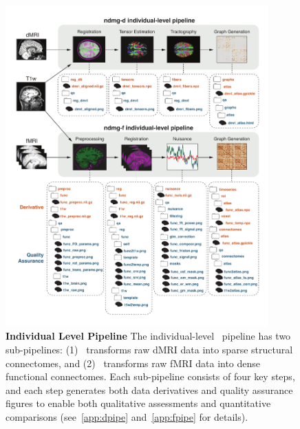 \documentclass[11pt]{article}
\begin{document}
\begin{figure}[t!]
	\centering
	\includegraphics[width=0.9\textwidth]{./figs/ndmg_pipeline.pdf}
    \caption{\textbf{Individual Level Pipeline}
  The individual-level  \ndmg~pipeline has two sub-pipelines:  (1) \ndmgd~transforms raw dMRI data into sparse structural connectomes, and (2) \ndmgf~transforms raw fMRI data into dense functional connectomes.  Each sub-pipeline consists of four key steps, and each step generates both data derivatives and quality assurance figures to enable both qualitative assessments and quantitative comparisons (see~\ref{app:dpipe} and~\ref{app:fpipe} for details).  
}
	\label{fig:ndmgpipeline}
\end{figure}

%
\end{document}
